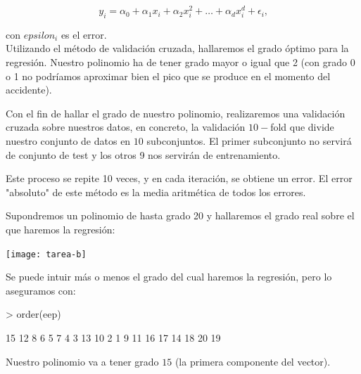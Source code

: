 \documentclass[a4paper,12pt]{article}
\begin{document}
\begin{equation*}
y_i = \alpha_0 + \alpha_1 x_i + \alpha_2 x_i^2 +  \dots + \alpha_d x_i^d + \epsilon_i\text{,}
\end{equation*}

con $epsilon_i$ es el error.\\

Utilizando el m\'etodo de validaci\'on cruzada, hallaremos el grado \'optimo para la regresi\'on. Nuestro polinomio ha de tener grado mayor o igual que 2 (con grado 0 o 1 no podríamos aproximar bien el pico que se produce en el momento del accidente). 

Con el fin de hallar el grado de nuestro polinomio, realizaremos una validación cruzada sobre nuestros datos, en concreto, la validación $10-$fold que divide nuestro conjunto de datos en $10$ subconjuntos. El primer subconjunto no servirá de conjunto de test y los otros 9 nos servirán de entrenamiento. 

Este proceso se repite 10 veces, y en cada iteración, se obtiene un error. El error "absoluto" de este método es la media aritmética de todos los errores.

Supondremos un polinomio de hasta grado 20 y hallaremos el grado real sobre el que haremos la regresión:\\


\begin{Schunk}
\end{Schunk}
\texttt{[image: tarea-b]}


Se puede intuir m\'as o menos el grado del cual haremos la regresi\'on, pero lo aseguramos con:

\begin{Schunk}
\begin{Sinput}
> order(eep)
\end{Sinput}
\begin{Soutput}
 [1] 15 12  8  6  5  7  4  3 13 10  2  1  9 11 16 17 14 18 20 19
\end{Soutput}
\end{Schunk}

Nuestro polinomio va a tener grado $15$ (la primera componente del vector). 
\end{document}
